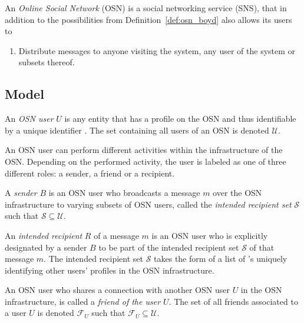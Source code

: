 \begin{defn}[OSN]
\label{def:osn}
 An \textit{Online Social Network} (OSN) is a social networking service (SNS), that in addition to the possibilities from Definition~\ref{def:osn_boyd} also allows its users to
 \begin{enumerate}
  \setcounter{enumi}{\theenumTemp}
  \item Distribute messages to anyone visiting the system, any user of the system or subsets thereof.
 \end{enumerate}
\end{defn}


\subsection{Model}
\label{sec:model}
\begin{defn}
\label{def:user}
 An \textit{OSN user} $U$ is any entity that has a profile on the OSN and thus identifiable by a unique identifier . The set containing all users of an OSN is denoted $\mathcal{U}$.
\end{defn}

An OSN user can perform different activities within the infrastructure of the OSN. Depending on the performed activity, the user is labeled as one of three different roles: a sender, a friend or a recipient.

\begin{defn}[Sender]
\label{def:sender}
 A \textit{sender} $B$ is an OSN user who broadcasts a message $m$ over the OSN infrastructure to varying subsets of OSN users, called the \textit{intended recipient set} $\mathcal{S}$ such that $\mathcal{S} \subseteq \mathcal{U}$.
\end{defn}

\begin{defn}
\label{def:recipient}
 An \textit{intended recipient} $R$ of a message $m$ is an OSN user who is explicitly designated by a sender $B$ to be part of the intended recipient set $\mathcal{S}$ of that message $m$. The intended recipient set $\mathcal{S}$ takes the form of a list of \id{}'s uniquely identifying other users' profiles in the OSN infrastructure.
\end{defn}

\begin{defn}[Friend]
\label{def:friend}
 An OSN user who shares a connection with another OSN user $U$ in the OSN infrastructure, is called a \textit{friend of the user $U$}. The set of all friends associated to a user $U$ is denoted $\mathcal{F}_U$ such that $\mathcal{F}_U \subseteq \mathcal{U}$.
\end{defn}

